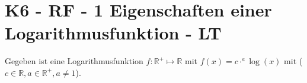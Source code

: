 \section{K6 - RF - 1 Eigenschaften einer Logarithmusfunktion - LT}

\begin{beispiel}[K6 - RF]{1} %
				Gegeben ist eine Logarithmusfunktion $f:\mathbb{R}^+\mapsto\mathbb{R}$ mit $f(x)=c\cdot^a\log(x)$ mit ($c\in\mathbb{R}, a\in\mathbb{R}^+, a\neq 1$).

\end{beispiel}